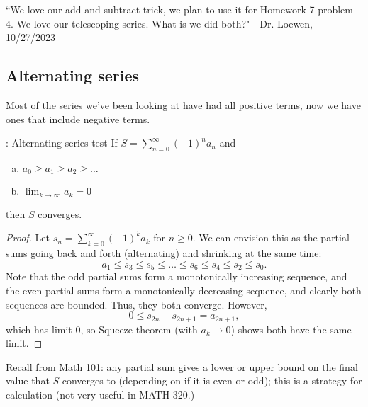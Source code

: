 \begin{nquote}{}
	``We love our add and subtract trick, we plan to use it for Homework 7 problem 4. We love our telescoping series. What is we did both?" - Dr. Loewen, 10/27/2023
\end{nquote}

\clearpage

\subsection{Alternating series}
Most of the series we've been looking at have had all positive terms, now we have ones that include negative terms.
\begin{ntheorem}{: Alternating series test}
	If \(S=\displaystyle\sum_{n=0}^{\infty}(-1)^na_n\) and 
	\begin{enumerate}[(a)]
		\item \(a_0\geq a_1\geq a_2\geq\dots\)
		
		\item \(\displaystyle\lim_{k\to\infty}a_k=0\)
	\end{enumerate}
	then \(S\) converges.
\end{ntheorem}
\begin{proof}
	Let \(s_n=\displaystyle\sum_{k=0}^{\infty}(-1)^ka_k\) for \(n\geq 0\). We can envision this as the partial sums going back and forth (alternating) and shrinking at the same time:
	\begin{equation*}
		a_1\leq s_3\leq s_5\leq\dots\leq s_6\leq s_4\leq s_2\leq s_0.
	\end{equation*}
	Note that the odd partial sums form a monotonically increasing sequence, and the even partial sums form a monotonically decreasing sequence, and clearly both sequences are bounded. Thus, they both converge. However,
	\begin{equation*}
		0\leq s_{2n}-s_{2n+1}=a_{2n+1},
	\end{equation*}
	which has limit \(0\), so Squeeze theorem (with \(a_k\to 0\)) shows both have the same limit.
\end{proof}
\begin{note}
	Recall from Math 101: any partial sum gives a lower or upper bound on the final value that \(S\) converges to (depending on if it is even or odd); this is a strategy for calculation (not very useful in MATH 320.)
\end{note}

